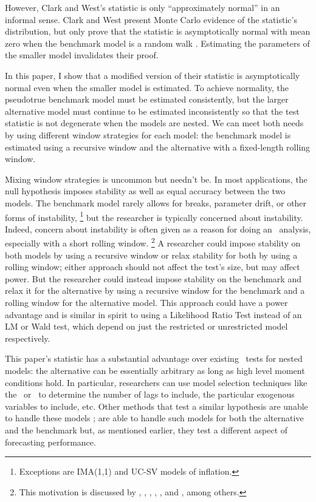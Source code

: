 \documentclass[12pt,fleqn]{article}
\begin{document}
However, Clark and West's statistic is only ``approximately normal''
in an informal sense.  Clark and West present Monte Carlo evidence of
the statistic's distribution, but only prove that the statistic is
asymptotically normal with mean zero when the benchmark model is a
random walk \citep{ClW:06}. Estimating the parameters of the smaller
model invalidates their proof.

In this paper, I show that a modified version of their statistic is
asymptotically normal even when the smaller model is estimated.  To
achieve normality, the pseudotrue benchmark model must be estimated
consistently, but the larger alternative model must continue to be
estimated inconsistently so that the test statistic is not degenerate
when the models are nested. We can meet both needs by
using different window strategies for each model: the benchmark model
is estimated using a recursive window and the alternative with a
fixed-length rolling window.

Mixing window strategies is uncommon but needn't be. In most
applications, the null hypothesis imposes stability as well as equal
accuracy between the two models.  The benchmark model rarely allows
for breaks, parameter drift, or other forms of
instability,%
\footnote{Exceptions are 
  IMA(1,1) and UC-SV models of inflation.} %
but the
researcher is typically concerned about instability.  Indeed, concern
about instability is often given as a reason for doing an \oos\
analysis, especially with a short rolling window.%
\footnote{This
  motivation is discussed by \citet{StW:03}, \citet{PeT:05,PeT:07},
  \cite{GiW:06}, \citet{GoW:08}, \citet{ClM:09c}, and
  \cite{GiR:09,GiR:10}, among others.} %
A researcher could impose
stability on both models by using a recursive window or relax
stability for both by using a rolling window; either approach should
not affect the test's size, but may affect power.  But the researcher
could instead impose stability on the benchmark and relax it for the
alternative by using a recursive window for the benchmark and a
rolling window for the alternative model.  This approach could have a
power advantage and is similar in spirit to using a Likelihood Ratio
Test instead of an LM or Wald test, which depend on just the
restricted or unrestricted model respectively.

This paper's statistic has a substantial advantage over existing \oos\
tests for nested models: the alternative can be essentially arbitrary
as long as high level moment conditions hold.  In particular,
researchers can use model selection techniques like the \aic\ or \bic\
to determine the number of lags to include, the particular exogenous
variables to include, etc.  Other methods that test a similar
hypothesis are unable to handle these models \citep[except][which does
not allow the benchmark to be estimated]{ClW:06}; \citet{GiW:06} are
able to handle such models for both the alternative and the benchmark
but, as mentioned earlier, they test a different aspect of forecasting
performance.
\end{document}
